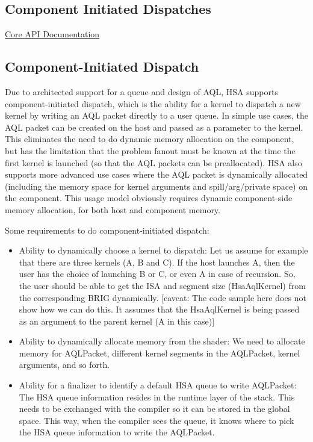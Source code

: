 \documentclass{book}
\begin{document}
\begin{appendices}
\chapter{Component Initiated Dispatches} \label{architected}
\hypertarget{architectedchptr}{}

\hyperlink{coreapi}{Core API
Documentation}\hypertarget{coreapi_dtde}{}\section{Component-\/\-Initiated
Dispatch}\label{coreapi_dtde}

Due to architected support for a queue and design of AQL,
HSA supports component-\/initiated dispatch, which is the ability
for a kernel to dispatch a new kernel by writing an AQL packet
directly to a user queue. In simple use cases, the AQL packet
can be created on the host and passed as a parameter to the kernel.
This eliminates the need to do dynamic memory allocation on the
component, but has the limitation that the problem fanout must be known
at the time the first kernel is launched (so that the AQL
packets can be preallocated). HSA also supports more advanced
use cases where the AQL packet is dynamically allocated
(including the memory space for kernel arguments and
spill/arg/private space) on the component. This usage model obviously
requires dynamic component-\/side memory allocation, for both host and
component memory.

Some requirements to do component-\/initiated dispatch:
\begin{itemize}
\item Ability to dynamically choose a kernel to dispatch\-: Let us
assume for example that there are three kernels (A, B and C). If the
host launches A, then the user has the choice of launching B or C,
or even A in case of recursion. So, the user should be able to get
the ISA and segment size (Hsa\-Aql\-Kernel) from the
corresponding BRIG dynamically. \mbox{[}caveat\-: The code
sample here does not show how we can do this. It assumes that the
Hsa\-Aql\-Kernel is being passed as an argument to the parent kernel
(A in this case)\mbox{]}

\item Ability to dynamically allocate memory from the shader\-: We
need to allocate memory for AQL\-Packet, different kernel
segments in the AQL\-Packet, kernel arguments, and so forth.

\item Ability for a finalizer to identify a default HSA queue to
write AQL\-Packet\-: The HSA queue information resides in
the runtime layer of the stack. This needs to be exchanged with the
compiler so it can be stored in the global space. This way, when the
compiler sees the queue, it knows where to pick the HSA queue
information to write the AQL\-Packet.


\end{itemize}
\end{appendices}
\end{document}
